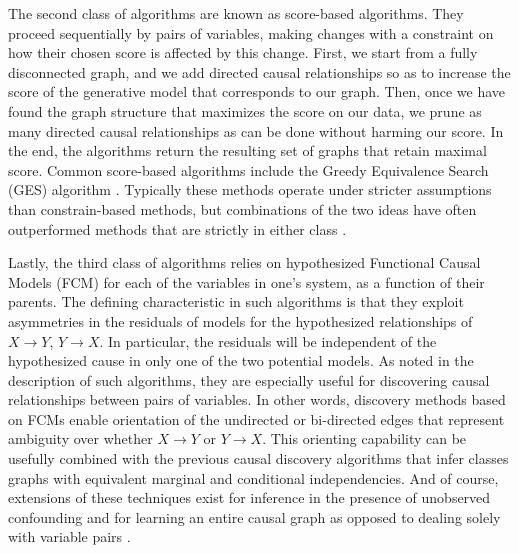 The second class of algorithms are known as score-based algorithms.
They proceed sequentially by pairs of variables, making changes with a constraint on how their chosen score is affected by this change.
First, we start from a fully disconnected graph, and we add directed causal relationships so as to increase the score of the generative model that corresponds to our graph.
Then, once we have found the graph structure that maximizes the score on our data, we prune as many directed causal relationships as can be done without harming our score.
In the end, the algorithms return the resulting set of graphs that retain maximal score.
Common score-based algorithms include the Greedy Equivalence Search (GES) algorithm \citep{chickering_2002_optimal}.
Typically these methods operate under stricter assumptions than constrain-based methods, but combinations of the two ideas have often outperformed methods that are strictly in either class \citep{glymour_2019_review}.

Lastly, the third class of algorithms relies on hypothesized Functional Causal Models (FCM) \citep{goudet_2018_learning} for each of the variables in one's system, as a function of their parents.
The defining characteristic in such algorithms is that they exploit asymmetries in the residuals of models for the hypothesized relationships of $X \rightarrow Y$, $Y \rightarrow X$.
In particular, the residuals will be independent of the hypothesized cause in only one of the two potential models.
As noted in the description of such algorithms, they are especially useful for discovering causal relationships between pairs of variables.
In other words, discovery methods based on FCMs enable orientation of the undirected or bi-directed edges that represent ambiguity over whether $X \rightarrow Y$ or $Y \rightarrow X$.
This orienting capability can be usefully combined with the previous causal discovery algorithms that infer classes graphs with equivalent marginal and conditional independencies.
And of course, extensions of these techniques exist for inference in the presence of unobserved confounding \citep[Sec. 6]{goudet_2018_learning} and for learning an entire causal graph as opposed to dealing solely with variable pairs \citep{zheng_2020_learning}.

